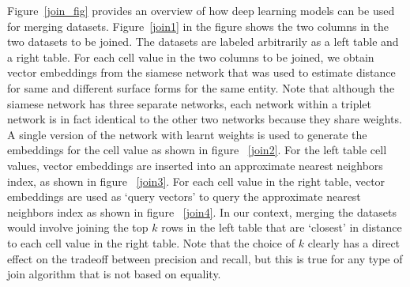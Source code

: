 Figure~\ref{join_fig} provides an overview of how deep learning models can be used for merging datasets.  Figure~\ref{join1} in the figure shows the two columns in the two datasets to be joined.  The datasets are labeled arbitrarily as a left table and a right table.  For each cell value in the two columns to be joined, we obtain vector embeddings from the siamese network that was used to estimate distance for same and different surface forms for the same entity.  Note that although the siamese network has three separate networks, each network within a triplet network is in fact identical to the other two networks because they share weights.  A single version of the network with learnt weights is used to generate the embeddings for the cell value as shown in figure ~\ref{join2}. For the left table cell values, vector embeddings are inserted into an approximate nearest neighbors index, as shown in figure ~\ref{join3}.  For each cell value in the right table, vector embeddings are used as `query vectors' to query the approximate nearest neighbors index as shown in figure ~\ref{join4}.  In our context, merging the datasets would involve joining the top $k$ rows in the left table that are `closest' in distance to each cell value in the right table.  Note that the choice of $k$ clearly has a direct effect on the tradeoff between precision and recall, but this is true for any type of join algorithm that is not based on equality.

